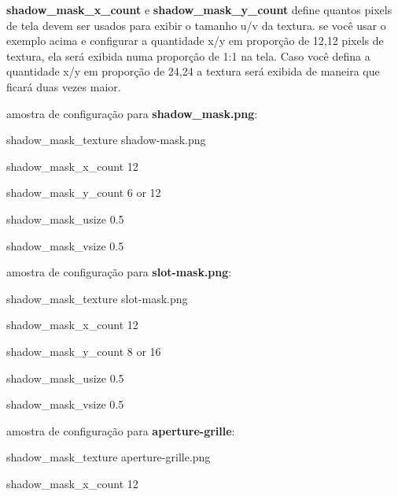 \documentclass[letterpaper,10pt,brazil]{sphinxmanual}
\begin{document}
\begin{DUlineblock}{0em}
\begin{DUlineblock}{\DUlineblockindent}
\item[] 
\item[] \textbf{shadow\_mask\_x\_count} e \textbf{shadow\_mask\_y\_count} define quantos pixels de tela devem ser usados para exibir o tamanho u/v da textura. se você usar o exemplo acima e configurar a quantidade x/y em proporção de 12,12 pixels de textura, ela será exibida numa proporção de 1:1 na tela. Caso você defina a quantidade x/y em proporção de 24,24 a textura será exibida de maneira que ficará duas vezes maior.
\item[] 
\end{DUlineblock}
\item[] amostra de configuração para \textbf{shadow\_mask.png}:
\item[] 
\item[]
\begin{DUlineblock}{\DUlineblockindent}
\item[] shadow\_mask\_texture shadow-mask.png
\item[] shadow\_mask\_x\_count 12
\item[] shadow\_mask\_y\_count 6 or 12
\item[] shadow\_mask\_usize 0.5
\item[] shadow\_mask\_vsize 0.5
\item[] 
\end{DUlineblock}
\item[] amostra de configuração para \textbf{slot-mask.png}:
\item[] 
\item[]
\begin{DUlineblock}{\DUlineblockindent}
\item[] shadow\_mask\_texture slot-mask.png
\item[] shadow\_mask\_x\_count 12
\item[] shadow\_mask\_y\_count 8 or 16
\item[] shadow\_mask\_usize 0.5
\item[] shadow\_mask\_vsize 0.5
\item[] 
\end{DUlineblock}
\item[] amostra de configuração para \textbf{aperture-grille}:
\item[] 
\item[]
\begin{DUlineblock}{\DUlineblockindent}
\item[] shadow\_mask\_texture aperture-grille.png
\item[] shadow\_mask\_x\_count 12

\end{DUlineblock}
\end{DUlineblock}
\end{document}
